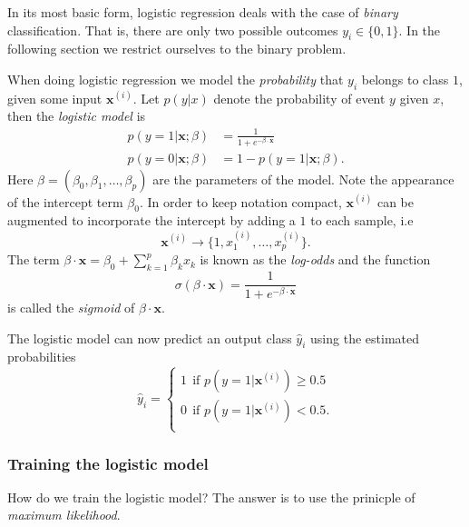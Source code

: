 \documentclass[a4paper, twocolumn]{article}
\begin{document}
In its most basic form, logistic regression deals with the case of \textit{binary} classification. That is, there are only 
two possible outcomes $y_i \in \{0,1\}$. In the following section we restrict ourselves to the binary problem.

When doing logistic regression we model the \textit{probability} that $y_i$ belongs 
to class $1$, given some input $\mathbf{x}^{(i)}$. Let $p(y|x)$ denote the probability of event $y$ given $x$,
then the \textit{logistic model} is 
\begin{align}
 p \left(y=1 | \mathbf{x}; \beta \right) &= \frac{1}{1+e^{-\beta \cdot \mathbf{x}}} \\
 p \left(y=0 | \mathbf{x}; \beta \right) &= 1 - p \left(y=1 | \mathbf{x}; \beta \right).
\end{align}
Here $\beta = (\beta_0, \beta_1, \dots, \beta_p)$ are the parameters of the model. Note the appearance of the intercept 
term $\beta_0$. In order to keep notation compact, $\mathbf{x}^{(i)}$ can be augmented to incorporate the intercept by adding 
a $1$ to each sample, i.e 
\begin{equation*}
 \mathbf{x}^{(i)} \rightarrow \{ 1, x_1^{(i)}, \dots, x_p^{(i)} \}.
\end{equation*}
The term $\beta \cdot \mathbf{x} = \beta_0 + \sum_{k=1}^p \beta_k x_k $ is known as the \textit{log-odds} and the function 
\begin{equation}
\sigma(\beta \cdot \mathbf{x}) = \frac{1}{1+e^{-\beta \cdot \mathbf{x}}} 
\end{equation}
is called the \textit{sigmoid} of $\beta \cdot \mathbf{x}$. 

The logistic model can now predict an output class $\hat{y}_i$ using the estimated probabilities  
\begin{equation}
 \hat{y}_i = \begin{cases}
            1 \ \ \text{if }  p \left(y=1 | \mathbf{x}^{(i)} \right) \geq 0.5 \\
            0 \ \ \text{if }  p \left(y=1 | \mathbf{x}^{(i)} \right) < 0.5. \\
           \end{cases}
\end{equation}
\subsubsection{Training the logistic model}
How do we train the logistic model? The answer is to use the prinicple of \textit{maximum likelihood}\autocite{Hastie}. 
\end{document}
